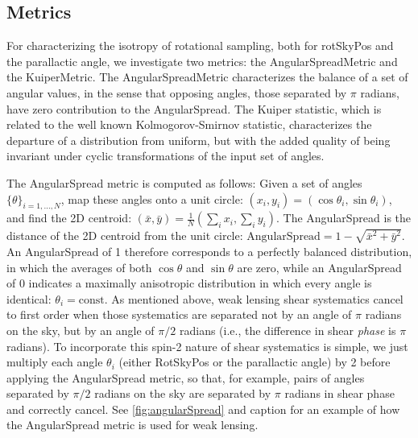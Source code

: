 \subsection{Metrics}

For characterizing the isotropy of rotational sampling, both for rotSkyPos and
the parallactic angle, we investigate two metrics: the AngularSpreadMetric and
the KuiperMetric.  The AngularSpreadMetric characterizes the balance of a set of
angular values, in the sense that opposing angles, those separated by $\pi$
radians, have zero contribution to the AngularSpread.  The Kuiper statistic,
which is related to the well known Kolmogorov-Smirnov statistic, characterizes
the departure of a distribution from uniform, but with the added quality of
being invariant under cyclic transformations of the input set of angles.

The AngularSpread metric is computed as follows:  Given a set of angles
$\{\theta\}_{i=1, ..., N}$, map these angles onto a unit circle: $(x_i, y_i) =
(\cos \theta_i, \sin \theta_i)$, and find the 2D centroid: $(\bar{x}, \bar{y}) =
\frac{1}{N} (\sum_i x_i, \sum_i y_i)$.  The AngularSpread is the distance of the
2D centroid from the unit circle: $\mathrm{AngularSpread} = 1 - \sqrt{\bar{x}^2 +
\bar{y}^2}$.  An AngularSpread of 1 therefore corresponds to a perfectly
balanced distribution, in which the averages of both $\cos \theta$ and $\sin
\theta$ are zero, while an AngularSpread of 0 indicates a maximally anisotropic
distribution in which every angle is identical: $\theta_i = \mathrm{const}$.  As
mentioned above, weak lensing shear systematics cancel to first order when those
systematics are separated not by an angle of $\pi$ radians on the sky, but by an
angle of $\pi/2$ radians (i.e., the difference in shear \emph{phase} is $\pi$
radians).  To incorporate this spin-2 nature of shear systematics is simple, we
just multiply each angle $\theta_i$ (either RotSkyPos or the parallactic angle)
by 2 before applying the AngularSpread metric, so that, for example, pairs of
angles separated by $\pi/2$ radians on the sky are separated by $\pi$ radians in
shear phase and correctly cancel.  See \autoref{fig:angularSpread} and caption for
an example of how the AngularSpread metric is used for weak lensing.


